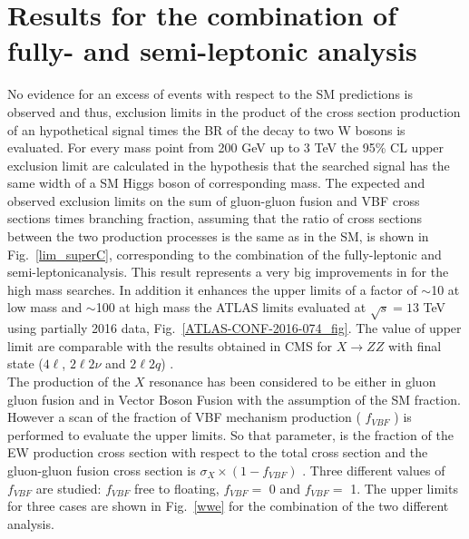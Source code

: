 \section{Results for the combination of fully- and semi-leptonic analysis}
No evidence for an excess of events with respect to the SM predictions is observed and thus, exclusion
limits in the product of the cross section production of an hypothetical signal times the BR of the decay
to two W bosons is evaluated.
For every mass point from 200 GeV up to 3 TeV the 95\% CL upper exclusion limit are calculated in the
hypothesis that the searched signal has the same width of a SM Higgs boson of corresponding mass.
The expected and observed exclusion limits on the sum of gluon-gluon fusion and VBF cross sections times branching
fraction, assuming that the ratio of cross sections between the two production processes is the same as in
the SM, is shown in Fig.~\ref{lim_superC}, corresponding to the combination of the fully-leptonic and semi-leptonicanalysis.
This result represents a very big improvements in for the high mass searches. 
In addition it enhances the upper limits of a factor of $\sim$10 at low mass and $\sim$100 at high mass the ATLAS limits evaluated at $\sqrt{s}=13$ TeV using partially 2016 data, Fig.~\ref{ATLAS-CONF-2016-074_fig}.
The value of upper limit are comparable with the results obtained in CMS for $X \to ZZ$ with final state ($4\ell$, $2\ell 2\nu$ and $2\ell 2q$) \cite{Sirunyan:2018qlb}.\\
\newline
The production of the $X$ resonance has been considered to be either in gluon gluon fusion and in Vector
Boson Fusion with the assumption of the SM fraction. 
However a scan of the fraction of VBF mechanism
production ( $f_{VBF}$ ) is performed to evaluate the upper limits. 
So that parameter, is the fraction of the EW production cross section with respect to the total cross section and the gluon-gluon fusion cross
section is $\sigma_X \times ( 1-  f_{VBF} )$ . Three different values of  $f_{VBF}$ are studied:   $f_{VBF}$ free to floating, $f_{VBF}=$ 0 and $f_{VBF}=$ 1. 
The upper limits for three cases are shown in Fig.~\ref{wwe}  for the combination of the two different analysis.
